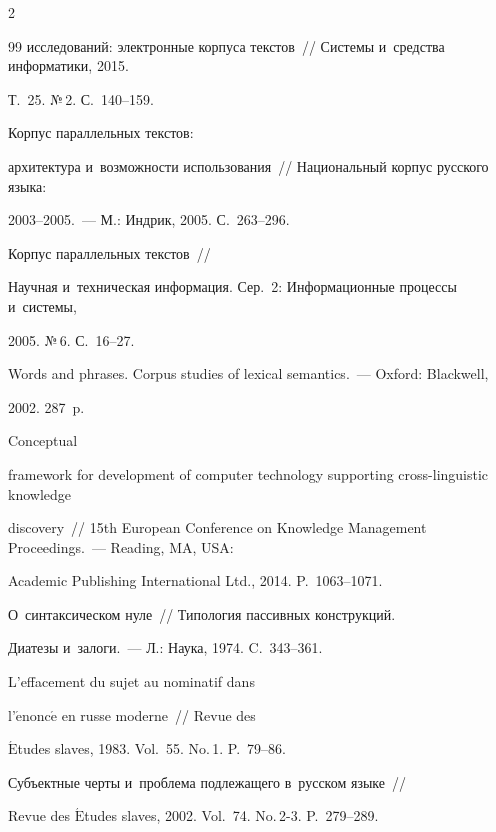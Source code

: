\begin{multicols}{2}
{{\begin{thebibliography}{99}
исследований: электронные корпуса текстов~// Системы и~средства информатики, 2015. 

Т.~25. №\,2. С.~140--159.


 Корпус параллельных текстов: 

архитектура и~возможности использования~// Национальный корпус русского языка: 

2003--2005.~--- М.: Индрик, 2005. С.~263--296.


 Корпус параллельных текстов~// 

Научная и~техническая информация. Сер.~2: Информационные процессы и~сис\-те\-мы, 

2005. №\,6. С.~16--27.


 Words and phrases. Corpus studies of lexical semantics.~--- Oxford: Blackwell, 

2002. 287~p.


 Conceptual 

framework for development of computer technology supporting cross-linguistic knowledge 

discovery~// 15th European Conference on Knowledge Management Proceedings.~--- Reading, MA, USA: 

Academic Publishing International Ltd., 2014. P.~1063--1071.


 О~синтаксическом нуле~// Типология пассивных конструкций. 

Диатезы и~залоги.~--- Л.: Наука, 1974. C.~343--361.


 L'effacement du sujet au nominatif dans 

l'$\acute{\mbox{e}}$nonc$\acute{\mbox{e}}$ en russe moderne~// Revue des 

$\acute{\mbox{E}}$tudes slaves, 1983. Vol.~55. No.\,1. P.~79--86.


 Субъектные черты и~проблема подлежащего в~русском языке~// 

Revue des $\acute{\mbox{E}}$tudes slaves, 2002. Vol.~74. No.\,2-3. P.~279--289.

 \end{thebibliography}



 }

 }



\end{multicols}



